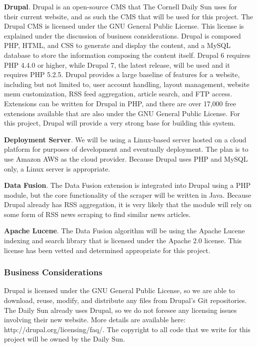 \documentclass[11pt]{article} %
\begin{document}
\textbf{Drupal}. Drupal is an open-source CMS that The Cornell Daily Sun uses for their current website, and as such the CMS that will be used for this project. The Drupal CMS is licensed under the GNU General Public License. This license is explained under the discussion of business considerations. Drupal is composed PHP, HTML, and CSS to generate and display the content, and a MySQL database to store the information composing the content itself. Drupal 6 requires PHP 4.4.0 or higher, while Drupal 7, the latest release, will be used and it requires PHP 5.2.5. Drupal provides a large baseline of features for a website, including but not limited to, user account handling, layout management, website menu customization, RSS feed aggregation, article search, and FTP access. Extensions can be written for Drupal in PHP, and there are over 17,000 free extensions available that are also under the GNU General Public License. For this project, Drupal will provide a very strong base for building this system.

\textbf{Deployment Server}. We will be using a Linux-based server hosted on a cloud platform for purposes of development and eventually deployment. The plan is to use Amazon AWS as the cloud provider. Because Drupal uses PHP and MySQL only, a Linux server is appropriate.

\textbf{Data Fusion}. The Data Fusion extension is integrated into Drupal using a PHP module, but the core functionality of the scraper will be written in Java. Because Drupal already has RSS aggregation, it is very likely that the module will rely on some form of RSS news scraping to find similar news articles.

\textbf{Apache Lucene}. The Data Fusion algorithm will be using the Apache Lucene indexing and search library that is licensed under the Apache 2.0 license. This license has been vetted and determined appropriate for this project.
                    
\subsubsection{Business Considerations}

Drupal is licensed under the GNU General Public License, so we are able to download, reuse, modify, and distribute any files from Drupal’s Git repositories. The Daily Sun already uses Drupal, so we do not foresee any licensing issues involving their new website. More details are available here: http://drupal.org/licensing/faq/. The copyright to all code that we write for this project will be owned by the Daily Sun.
\end{document}
